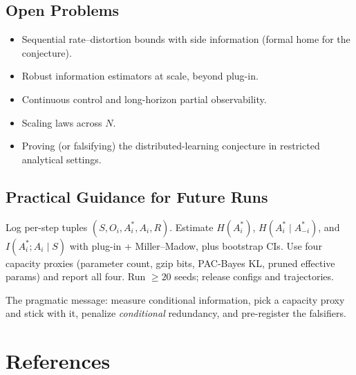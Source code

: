 \documentclass[10pt, letterpaper]{article}
\begin{document}
\subsection*{Open Problems}
\begin{itemize}
    \item Sequential rate--distortion bounds with side information (formal home for the conjecture).
    \item Robust information estimators at scale, beyond plug-in.
    \item Continuous control and long-horizon partial observability.
    \item Scaling laws across $N$.
    \item Proving (or falsifying) the distributed-learning conjecture in restricted analytical settings.
\end{itemize}

\subsection*{Practical Guidance for Future Runs}

Log per-step tuples $(S, O_i, A_i^*, A_i, R)$. Estimate $H(A_i^*)$, $H(A_i^*\mid A_{-i}^*)$, and $I(A_i^*; A_i\mid S)$ with plug-in + Miller--Madow, plus bootstrap CIs. Use four capacity proxies (parameter count, gzip bits, PAC-Bayes KL, pruned effective params) and report all four. Run $\geq 20$ seeds; release configs and trajectories.

The pragmatic message: measure conditional information, pick a capacity proxy and stick with it, penalize \emph{conditional} redundancy, and pre-register the falsifiers.

\section*{References}
\end{document}
